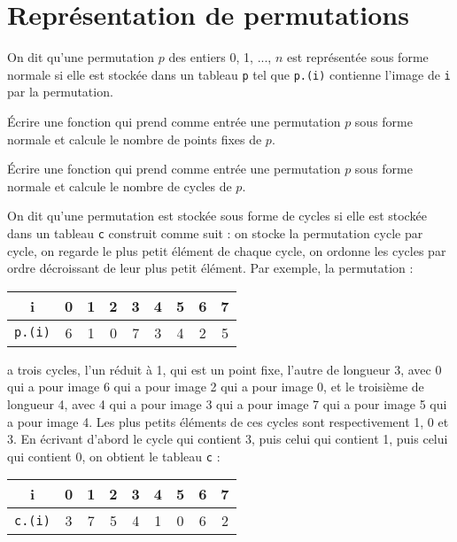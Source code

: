 \renewcommand{\SourceFile}{1-parcours-de-tableaux/src/1-6.ml}

\section{Représentation de permutations}

On dit qu'une permutation $p$ des entiers 0, 1, ..., $n$ est représentée sous forme normale si elle est stockée dans un tableau \texttt{p} tel que \texttt{p.(i)} contienne l'image de \texttt{i} par la permutation.

\Q
Écrire une fonction qui prend comme entrée une permutation $p$ sous forme normale et calcule le nombre de points fixes de $p$.

\Q
Écrire une fonction qui prend comme entrée une permutation $p$ sous forme normale et calcule le nombre de cycles de $p$.

\Q
On dit qu'une permutation est stockée sous forme de cycles si elle est stockée dans un tableau \texttt{c} construit comme suit : on stocke la permutation cycle par cycle, on regarde le plus petit élément de chaque cycle, on ordonne les cycles par ordre décroissant de leur plus petit élément. Par exemple, la permutation :

\begin{center}
    \begin{tabular}{ |c|c|c|c|c|c|c|c|c| }
        \hline
        i & 0 & 1 & 2 & 3 & 4 & 5 & 6 & 7 \\
        \hline
        \texttt{p.(i)} & 6 & 1 & 0 & 7 & 3 & 4 & 2 & 5 \\
        \hline
       \end{tabular}
\end{center}

a trois cycles, l'un réduit à 1, qui est un point fixe, l'autre de longueur 3, avec 0 qui a pour image 6 qui a pour image 2 qui a pour image 0, et le troisième de longueur 4, avec 4 qui a pour image 3 qui a pour image 7 qui a pour image 5 qui a pour image 4. Les plus petits éléments de ces cycles sont respectivement 1, 0 et 3. En écrivant d'abord le cycle qui contient 3, puis celui qui contient 1, puis celui qui contient 0, on obtient le tableau \texttt{c} :

\begin{center}
    \begin{tabular}{ |c|c|c|c|c|c|c|c|c| }
        \hline
        i & 0 & 1 & 2 & 3 & 4 & 5 & 6 & 7 \\
        \hline
        \texttt{c.(i)} & 3 & 7 & 5 & 4 & 1 & 0 & 6 & 2 \\
        \hline
       \end{tabular}
\end{center}

